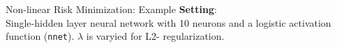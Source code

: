 \begin{frame}{Non-linear Risk Minimization: Example}
\textbf{Setting}: \\
Single-hidden layer neural network with 10 neurons and a logistic activation function (\texttt{nnet}). 
$\lambda$ is varyied for L2- regularization.\\

\smallskip


\end{frame}
